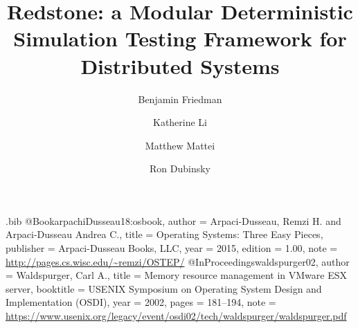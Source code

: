 \usepackage{filecontents}

\usepackage{setspace}
\linespread{1.25}

\begin{filecontents}{\jobname.bib}
@Book{arpachiDusseau18:osbook,
author =       {Arpaci-Dusseau, Remzi H. and Arpaci-Dusseau Andrea C.},
title =        {Operating Systems: Three Easy Pieces},
publisher =    {Arpaci-Dusseau Books, LLC},
year =         2015,
edition =      {1.00},
note =         {\url{http://pages.cs.wisc.edu/~remzi/OSTEP/}}
}
@InProceedings{waldspurger02,
author =       {Waldspurger, Carl A.},
title =        {Memory resource management in {VMware ESX} server},
booktitle =    {USENIX Symposium on Operating System Design and
Implementation (OSDI)},
year =         2002,
pages =        {181--194},
note =         {\url{https://www.usenix.org/legacy/event/osdi02/tech/waldspurger/waldspurger.pdf}}}
\end{filecontents}



\date{}

\title{\Large \bf Redstone: a Modular Deterministic Simulation Testing Framework for Distributed Systems}

\author{
{\rm Benjamin Friedman}\\
\and
{\rm Katherine Li}\\
\and
{\rm Matthew Mattei}\\
\and
{\rm Ron Dubinsky}\\
} %

\maketitle

